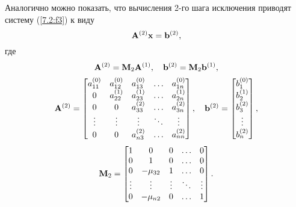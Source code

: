 \documentclass[12pt]{article}
\begin{document}
    Аналогично можно показать, что вычисления 2-го шага исключения приводят систему (\ref{7.2:f3}) к виду
    \begin{equation}
        \bold{A}^{\left(2\right)}\bold{x}=\bold{b}^{\left(2\right)},
    \end{equation}
    где
    \begin{equation}
        \bold{A}^{\left(2\right)}=\bold{M}_2\bold{A}^{\left(1\right)}, \quad \bold{b}^{\left(2\right)}=\bold{M}_2\bold{b}^{\left(1\right)},
    \end{equation}
    \begin{equation}
        \bold{A}^{\left(2\right)}=
        \begin{bmatrix}
        a_{11}^{\left(0\right)}       & a_{12}^{\left(0\right)} & a_{13}^{\left(0\right)} & \ldots                  & a_{1n}^{\left(0\right)} \\
        0                             & a_{22}^{\left(1\right)}   & a_{23}^{\left(1\right)} & \ldots                  & a_{2n}^{\left(1\right)} \\
        0                             & 0 & a_{33}^{\left(2\right)} & \ldots                  & a_{3n}^{\left(2\right)} \\
        \vdots                        & \vdots                  & \vdots                  & \ddots                  & \vdots \\
        0 & 0   & a_{n3}^{\left(2\right)} & \ldots                  & a_{nn}^{\left(2\right)}
        \end{bmatrix},\quad
        \bold{b}^{\left(2\right)}=
        \begin{bmatrix}
            b_1^{\left(0\right)} \\
            b_2^{\left(1\right)} \\
            b_3^{\left(2\right)} \\
            \vdots \\
            b_n^{{\left(2\right)}}
        \end{bmatrix},
    \end{equation}
    \begin{equation}
        \bold{M}_2=
        \begin{bmatrix}
            1 & 0 & 0 & \ldots & 0 \\
            0 & 1 & 0 & \ldots & 0 \\
            0 & -\mu_{32} & 1 & \ldots & 0 \\
             \vdots & \vdots & \vdots & \ddots & \vdots \\
             0 & -\mu_{n2} & 0 & \ldots & 1
        \end{bmatrix}.
    \end{equation}
\end{document}
